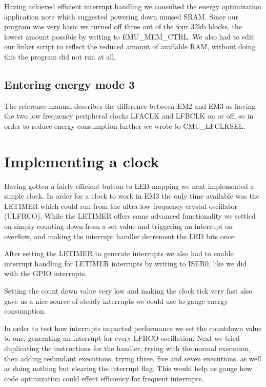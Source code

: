 Having achieved efficient interrupt handling we consulted the energy optimization application note which suggested powering down unused SRAM. Since our program was very basic we turned off three out of the four 32kb blocks, the lowest amount possible by writing to EMU\_MEM\_CTRL. We also had to edit our linker script to reflect the reduced amount of available RAM, without doing this the program did not run at all.

\subsection{Entering energy mode 3}

The reference manual describes the difference between EM2 and EM3 as having the two low frequency peripheral clocks LFACLK and LFBCLK on or off, so in order to reduce energy consumption further we wrote to CMU\_LFCLKSEL.

\section{Implementing a clock}

Having gotten a fairly efficient button to LED mapping we next implemented a simple clock. In order for a clock to work in EM3 the only time available was the LETIMER which could run from the ultra low frequency crystal oscillator (ULFRCO). While the LETIMER offers some advanced functionality we settled on simply counting down from a set value and triggering an interrupt on overflow, and making the interrupt handler decrement the LED bits once.

After setting the LETIMER to generate interrupts we also had to enable interrupt handling for LETIMER interrupts by writing to ISER0, like we did with the GPIO interrupts. 

Setting the count down value very low and making the clock tick very fast also gave us a nice source of steady interrupts we could use to gauge energy consumption.

In order to test how interrupts impacted performance we set the countdown value to one, generating an interrupt for every LFRCO oscillation. Next we tried duplicating the instructions for the handler, trying with the normal execution, then adding redundant executions, trying three, five and seven executions, as well as doing nothing but clearing the interrupt flag. This would help us gauge how code optimization could effect efficiency for frequent interrupts.
